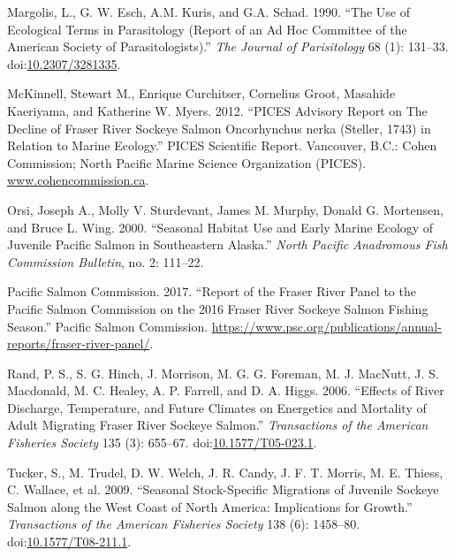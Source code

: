 \documentclass[fleqn,10pt]{wlpeerj} %
\begin{document}
\hypertarget{ref-Margolis1990}{}
Margolis, L., G. W. Esch, A.M. Kuris, and G.A. Schad. 1990. ``The Use of
Ecological Terms in Parasitology (Report of an Ad Hoc Committee of the
American Society of Parasitologists).'' \emph{The Journal of
Parisitology} 68 (1): 131--33.
doi:\href{https://doi.org/10.2307/3281335}{10.2307/3281335}.

\hypertarget{ref-McKinnell2012}{}
McKinnell, Stewart M., Enrique Curchitser, Cornelius Groot, Masahide
Kaeriyama, and Katherine W. Myers. 2012. ``PICES Advisory Report on The
Decline of Fraser River Sockeye Salmon Oncorhynchus nerka (Steller,
1743) in Relation to Marine Ecology.'' PICES Scientific Report.
Vancouver, B.C.: Cohen Commission; North Pacific Marine Science
Organization (PICES). \url{www.cohencommission.ca}.

\hypertarget{ref-Orsi2000}{}
Orsi, Joseph A., Molly V. Sturdevant, James M. Murphy, Donald G.
Mortensen, and Bruce L. Wing. 2000. ``Seasonal Habitat Use and Early
Marine Ecology of Juvenile Pacific Salmon in Southeastern Alaska.''
\emph{North Pacific Anadromous Fish Commission Bulletin}, no. 2:
111--22.

\hypertarget{ref-PacificSalmonCommission2017}{}
Pacific Salmon Commission. 2017. ``Report of the Fraser River Panel to
the Pacific Salmon Commission on the 2016 Fraser River Sockeye Salmon
Fishing Season.'' Pacific Salmon Commission.
\url{https://www.psc.org/publications/annual-reports/fraser-river-panel/}.

\hypertarget{ref-Rand2006}{}
Rand, P. S., S. G. Hinch, J. Morrison, M. G. G. Foreman, M. J. MacNutt,
J. S. Macdonald, M. C. Healey, A. P. Farrell, and D. A. Higgs. 2006.
``Effects of River Discharge, Temperature, and Future Climates on
Energetics and Mortality of Adult Migrating Fraser River Sockeye
Salmon.'' \emph{Transactions of the American Fisheries Society} 135 (3):
655--67.
doi:\href{https://doi.org/10.1577/T05-023.1}{10.1577/T05-023.1}.

\hypertarget{ref-Tucker2009}{}
Tucker, S., M. Trudel, D. W. Welch, J. R. Candy, J. F. T. Morris, M. E.
Thiess, C. Wallace, et al. 2009. ``Seasonal Stock-Specific Migrations of
Juvenile Sockeye Salmon along the West Coast of North America:
Implications for Growth.'' \emph{Transactions of the American Fisheries
Society} 138 (6): 1458--80.
doi:\href{https://doi.org/10.1577/T08-211.1}{10.1577/T08-211.1}.
\end{document}
